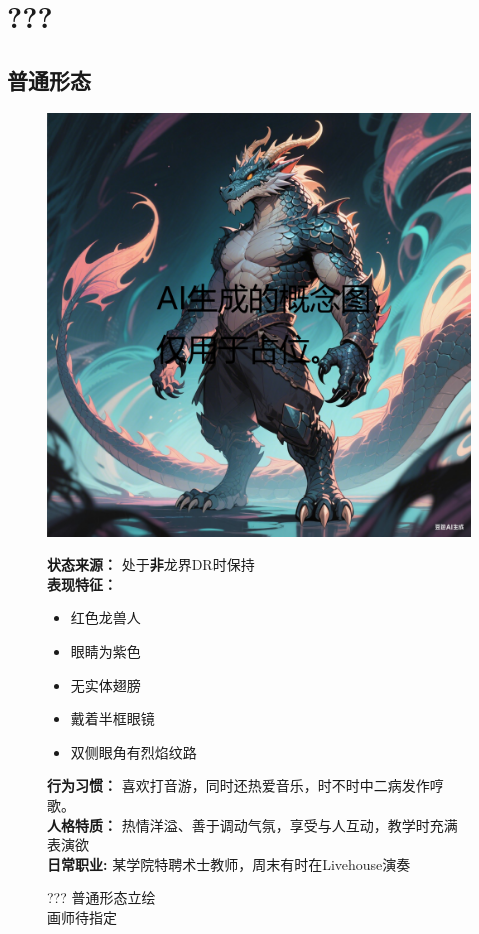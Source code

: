 \documentclass[lang=cn,newtx,10pt,scheme=chinese]{elegantbook}
\newcommand{\dr}{???}
\begin{document}
\newpage

\section{\dr{}}
\subsection{普通形态}
\begin{figure}[H]
    \begin{minipage}[c]{0.48\textwidth}
        \centering
        \includegraphics[width=\linewidth]{drago/normal.png}
        \caption{\dr{} 普通形态立绘\\\centering 画师待指定}
        \label{fig:drnormal}
    \end{minipage}
    \hfill
    \begin{minipage}[c]{0.48\textwidth}
        \textbf{状态来源：} 处于\textbf{非}龙界DR时保持\\
        \textbf{表现特征：}
        \begin{itemize}
            \setlength\itemsep{0em}
            \item 红色龙兽人
            \item 眼睛为紫色
            \item 无实体翅膀
            \item 戴着半框眼镜
            \item 双侧眼角有烈焰纹路
        \end{itemize}
        \textbf{行为习惯：} 喜欢打音游，同时还热爱音乐，时不时中二病发作哼歌。\\
        \textbf{人格特质：} 热情洋溢、善于调动气氛，享受与人互动，教学时充满表演欲\\
        \textbf{日常职业:} 某学院特聘术士教师，周末有时在Livehouse演奏\\
        \vspace*{\fill}
    \end{minipage}
\end{figure}
\end{document}
